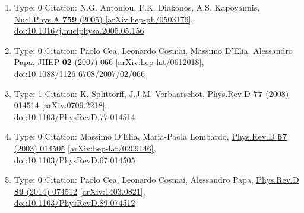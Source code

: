 \documentclass[a4paper,10pt]{article}
\begin{document}
\begin{enumerate}
\begin{enumerate}
  \item Type: 0 Citation: N.G. Antoniou, F.K. Diakonos, A.S. Kapoyannis, \href{https://www.doi.org/10.1016/j.nuclphysa.2005.05.156}{Nucl.Phys.A {\bf 759} (2005) }  \href{https://arxiv.org/abs/hep-ph/0503176}{[arXiv:hep-ph/0503176]},\\\href{https://www.doi.org/10.1016/j.nuclphysa.2005.05.156}{doi:10.1016/j.nuclphysa.2005.05.156}
  \item Type: 0 Citation: Paolo Cea, Leonardo Cosmai, Massimo D'Elia, Alessandro Papa, \href{https://www.doi.org/10.1088/1126-6708/2007/02/066}{JHEP {\bf 02} (2007) 066}  \href{https://arxiv.org/abs/hep-lat/0612018}{[arXiv:hep-lat/0612018]},\\\href{https://www.doi.org/10.1088/1126-6708/2007/02/066}{doi:10.1088/1126-6708/2007/02/066}
  \item Type: 1 Citation: K. Splittorff, J.J.M. Verbaarschot, \href{https://www.doi.org/10.1103/PhysRevD.77.014514}{Phys.Rev.D {\bf 77} (2008) 014514}  \href{https://arxiv.org/abs/0709.2218}{[arXiv:0709.2218]},\\\href{https://www.doi.org/10.1103/PhysRevD.77.014514}{doi:10.1103/PhysRevD.77.014514}
  \item Type: 0 Citation: Massimo D'Elia, Maria-Paola Lombardo, \href{https://www.doi.org/10.1103/PhysRevD.67.014505}{Phys.Rev.D {\bf 67} (2003) 014505}  \href{https://arxiv.org/abs/hep-lat/0209146}{[arXiv:hep-lat/0209146]},\\\href{https://www.doi.org/10.1103/PhysRevD.67.014505}{doi:10.1103/PhysRevD.67.014505}
  \item Type: 0 Citation: Paolo Cea, Leonardo Cosmai, Alessandro Papa, \href{https://www.doi.org/10.1103/PhysRevD.89.074512}{Phys.Rev.D {\bf 89} (2014) 074512}  \href{https://arxiv.org/abs/1403.0821}{[arXiv:1403.0821]},\\\href{https://www.doi.org/10.1103/PhysRevD.89.074512}{doi:10.1103/PhysRevD.89.074512}

\end{enumerate}
\end{enumerate}
\end{document}

